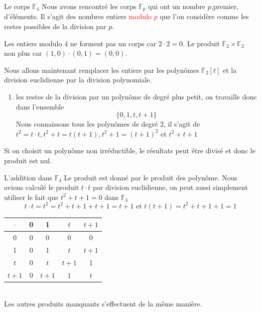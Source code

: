 \begin{parag}{Le corps $\mathbb{F}_4$}
    Nous avons rencontré les corps $ \mathbb{F}_p$ qui ont un nombre $p$,premier, d'éléments. Il s'agit des nombres entiers \textcolor{red}{modulo $p$} que l'on considère comme les restes possibles de la division par $p$.
    \begin{framedremark}
        Les entiers modulo $4$ ne forment pas un corps car $2 \cdot 2 = 0$. Le produit $\mathbb{F}_2 \times \mathbb{F}_2$ non plus car $(1, 0) \cdot (0, 1) = (0, 0)$.
    \end{framedremark}
    Nous allons maintenant remplacer les entiers par les polynômes $\mathbb{F}_2[t]$ et la division euclidienne par la division polynomiale.
    \begin{enumerate}
        \item les restes de la division par un polynôme de degré plus petit, on travaille donc dans l'ensemble
        \[\{0, 1, t, t+1\}\]
        Nous connaissons tous les polynômes de degré $2$, il s'agit de $t^2 = t\cdot t, t^2 + t = t(t+1), t^2+1 = (t+1)^2$ et $t^2 + t + 1$
    \end{enumerate}
    \begin{framedremark}
        Si on choisit un polynôme non irréductible, le résultats peut être divisé et donc le produit est nul.
    \end{framedremark}
    \begin{subparag}{L'addition dans $\mathbb{F}_4$}
    Le produit est donné par le produit des polynôme. Nous avions calculé le produit $t\cdot t$ par division euclidienne, on peut aussi simplement utiliser le fait que $t^2 + t + 1 = 0$ dans $\mathbb{F}_4$
    \[t\cdot t = t^2 = t^2 + t + 1 + t + 1 = t + 1 \text{ et } t(t+1) = t^2 + t + 1 + 1 = 1\]
        
       
           \begin{tabular}{|c||c|c|c|c|}
           \hline
               $\cdot$ &0  & 1 & $t$ & $t+1$\\
               \hline
               \hline
               $0$ & 0 & 0 & 0 & 0\\
               \hline
                1&0& 1 & $t$ & $t+1$ \\
                \hline
                $t$& 0 & $t$ & $t+1$ &1 \\
                \hline
                $t+1$& 0 & $t+1$ & $1$ & $t$\\
                \hline
           \end{tabular}
        \\
        Les autres produits manquants s'effectuent de la même manière.
        
    \end{subparag}
\end{parag}